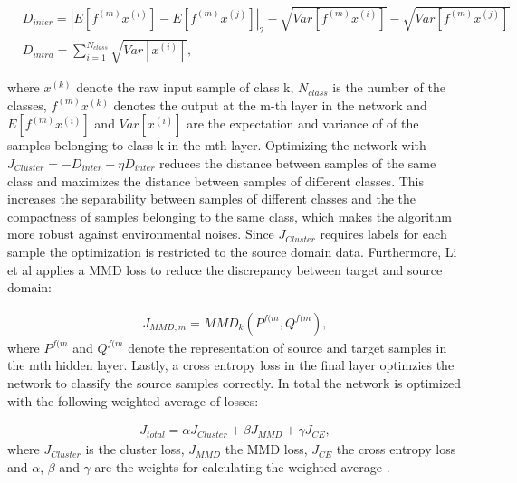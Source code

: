 \begin{equation}
    \begin{aligned}
       &D_{inter} = |E[f^{(m)}x^{(i)}]-E[f^{(m)}x^{(j)}]|_{2}-\sqrt{Var[f^{(m)}x^{(i)}]}-\sqrt{Var[f^{(m)}x^{(j)}]}\\
       &D_{intra} = 
        \sum_{i=1}^{N_{class}} \sqrt{Var[x^{(i)}]},
    \end{aligned}
\end{equation}

where $x^{(k)}$ denote the raw input sample of class k, $N_{class}$ is the number of the classes, $f^{(m)}x^{(k)}$ denotes the output at the m-th layer in the network and $E[f^{(m)}x^{(i)}]$ and $Var[x^{(i)}]$ are the  expectation and variance of of the samples belonging to class k in the mth layer. Optimizing the network with $J_{Cluster} = - D_{inter} + \eta D_{inter}$ reduces the distance between samples of the same class and maximizes the distance between samples of different classes. This increases the separability between samples of different classes and the the compactness of samples belonging to the same class, which makes the algorithm more robust against environmental noises. Since $J_{Cluster}$  requires labels for each sample the optimization is restricted to the source domain data. Furthermore, Li et al applies a MMD loss to reduce the discrepancy between target and source domain: 

\begin{equation}
    \begin{aligned}
    J_{MMD,m} = MMD_{k}(P^{f(m}, Q^{f(m}),
    \end{aligned}
\end{equation}
where $P^{f(m}$ and $Q^{f(m}$ denote the representation of source and target samples in the mth hidden layer. Lastly, a cross entropy loss in the final layer optimzies the network to classify the source samples correctly. In total the network is optimized with the following weighted average of losses: 

\begin{equation}
    \begin{aligned}
    J_{total} = \alpha J_{Cluster} + \beta J_{MMD} + \gamma J_{CE}, 
    \end{aligned}
\end{equation}
where $J_{Cluster}$ is the cluster loss, $J_{MMD}$ the MMD loss,  $J_{CE}$ the cross entropy loss and $\alpha$, $\beta$ and $\gamma$ are the weights for calculating the weighted average \cite{Li2018}.



